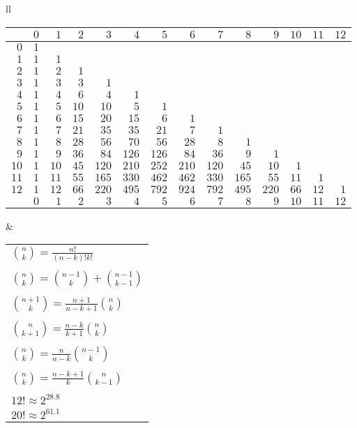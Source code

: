 \documentclass[a4paper, 12pt]{article}
\begin{document}
\begin{tabular}{ll}
  \begin{tabular}{r|rrrrrrrrrrrrr}
  & $0$ & $1$ & $2$ & $3$ & $4$ & $5$ & $6$ & $7$ & $8$ & $9$ & $10$ & $11$ & $12$ \\
  \hline
  $0$ & $1$\\
  $1$ & $1$ & $1$\\
  $2$ & $1$ & $2$ & $1$\\
  $3$ & $1$ & $3$ & $3$ & $1$\\
  $4$ & $1$ & $4$ & $6$ & $4$ & $1$\\
  $5$ & $1$ & $5$ & $10$ & $10$ & $5$ & $1$\\
  $6$ & $1$ & $6$ & $15$ & $20$ & $15$ & $6$ & $1$\\
  $7$ & $1$ & $7$ & $21$ & $35$ & $35$ & $21$ & $7$ & $1$\\
  $8$ & $1$ & $8$ & $28$ & $56$ & $70$ & $56$ & $28$ & $8$ & $1$\\
  $9$ & $1$ & $9$ & $36$ & $84$ & $126$ & $126$ & $84$ & $36$ & $9$ & $1$\\
  $10$ & $1$ & $10$ & $45$ & $120$ & $210$ & $252$ & $210$ & $120$ & $45$ & $10$ & $1$\\
  $11$ & $1$ & $11$ & $55$ & $165$ & $330$ & $462$ & $462$ & $330$ & $165$ & $55$ & $11$ & $1$\\
  $12$ & $1$ & $12$ & $66$ & $220$ & $495$ & $792$ & $924$ & $792$ & $495$ & $220$ & $66$ & $12$ & $1$ \\
  \hline
  & $0$ & $1$ & $2$ & $3$ & $4$ & $5$ & $6$ & $7$ & $8$ & $9$ & $10$ & $11$ & $12$
  \end{tabular}
&

\begin{tabular}{l}
${n \choose k} = \frac{n!}{(n-k)!k!}$                 \\ \\
${n \choose k} = {n-1 \choose k} + {n-1 \choose k-1}$ \\ \\
${n+1 \choose k} = \frac{n+1}{n-k+1} {n \choose k}$   \\ \\
${n \choose k+1} = \frac{n-k}{k+1} {n \choose k}$     \\ \\
${n \choose k} = \frac{n}{n-k} {n-1 \choose k}$       \\ \\
${n \choose k} = \frac{n-k+1}{k} {n \choose k-1}$     \\ \\

$12! \approx 2^{28.8}$ \\
$20! \approx 2^{61.1}$


\end{tabular}
\end{tabular}
\end{document}

